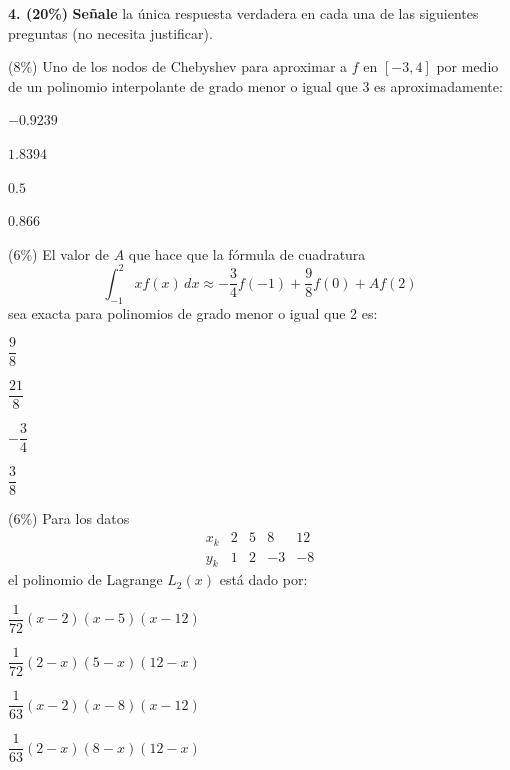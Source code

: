 \documentclass[11pt]{article}
\begin{document}
\vspace{5mm}
\noindent\textbf{4. (20\%)} \textbf{Señale} la única respuesta verdadera en cada una de las siguientes preguntas (no necesita justificar).
\begin{romanitos}
\item (8\%) Uno de los nodos de Chebyshev para aproximar a $f$ en $[-3,4]$ por medio de un polinomio interpolante de grado menor o igual que 3 es aproximadamente:
\begin{opciones}
\item $-0.9239$
\item $1.8394$
\item $0.5$
\item $0.866$
\end{opciones}
\item (6\%) El valor de $A$ que hace que la fórmula de cuadratura
\[
\int_{-1}^2 xf(x)\,dx\approx -\frac34 f(-1)+\frac98 f(0)+Af(2)
\]
sea exacta para polinomios de grado menor o igual que 2 es:
\begin{opciones}
\item $\dfrac98$
\item $\dfrac{21}8$
\item $-\dfrac34$
\item $\dfrac38$
\end{opciones}
\item (6\%) Para los datos
\[
\begin{array}{c|c|c|c|c}
x_k & 2 & 5 & 8 & 12\\ \hline
y_k & 1 & 2 & -3 & -8
\end{array}
\]
el polinomio de Lagrange $L_2(x)$ está dado por:
\begin{opciones}
\item $\dfrac1{72}(x-2)(x-5)(x-12)$
\item $\dfrac1{72}(2-x)(5-x)(12-x)$
\item $\dfrac1{63}(x-2)(x-8)(x-12)$
\item $\dfrac1{63}(2-x)(8-x)(12-x)$
\end{opciones}
\end{romanitos}
\end{document}
